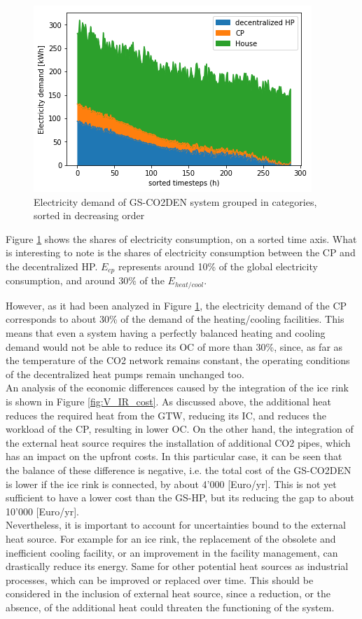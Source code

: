 \documentclass{article}
\begin{document}
\begin{figure}[tph]
	\centering
	\includegraphics[width=0.5\linewidth]{Images/V_CO2_eldem_sorted}
	\caption{Electricity demand of GS-CO2DEN system grouped in categories, sorted in decreasing order}
	\label{fig:gsco2_el}
\end{figure}
Figure \ref{fig:gsco2_el} shows the shares of electricity consumption, on a sorted time axis. What is interesting to note is the shares of electricity consumption between the CP and the decentralized HP. $E_{cp}$ represents around 10\% of the global electricity consumption, and around 30\% of the $E_{heat/cool}$.

However, as it had been analyzed in Figure \ref{fig:gsco2_el}, the electricity demand of the CP corresponds to about 30\% of the demand of the heating/cooling facilities. This means that even a system having a perfectly balanced heating and cooling demand would not be able to reduce its OC of more than 30\%, since, as far as the temperature of the CO2 network remains constant, the operating conditions of the decentralized heat pumps remain unchanged too.\\

An analysis of the economic differences caused by the integration of the ice rink is shown in Figure \ref{fig:V_IR_cost}. As discussed above, the additional heat reduces the required heat from the GTW, reducing its IC, and reduces the workload of the CP, resulting in lower OC. On the other hand, the integration of the external heat source requires the installation of additional CO2 pipes, which has an impact on the upfront costs. In this particular case, it can be seen that the balance of these difference is negative, i.e. the total cost of the GS-CO2DEN is lower if the ice rink is connected, by about 4'000 [Euro/yr]. This is not yet sufficient to have a lower cost than the GS-HP, but its reducing the gap to about 10'000 [Euro/yr].\\

Nevertheless, it is important to account for uncertainties bound to the external heat source. For example for an ice rink, the replacement of the obsolete and inefficient cooling facility, or an improvement in the facility management, can drastically reduce its energy. Same for other potential heat sources as industrial processes, which can be improved or replaced over time. This should be considered in the inclusion of external heat source, since a reduction, or the absence, of the additional heat could threaten the functioning of the system.
\end{document}
